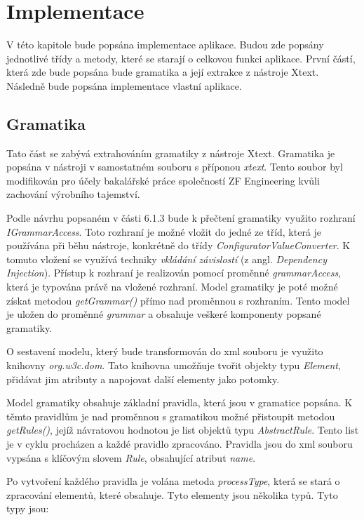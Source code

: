 \chapter{Implementace}

V této kapitole bude popsána implementace aplikace. Budou zde popsány jednotlivé třídy a metody, které se starají o celkovou funkci aplikace. První částí, která zde bude popsána bude gramatika a její extrakce z nástroje Xtext. Následně bude popsána implementace vlastní aplikace.

\section{Gramatika}

Tato část se zabývá extrahováním gramatiky z nástroje Xtext. Gramatika je popsána v nástroji v samostatném souboru s příponou \textit{xtext}. Tento soubor byl modifikován pro účely bakalářské práce společností ZF Engineering kvůli zachování výrobního tajemství.

Podle návrhu popsaném v části 6.1.3 bude k přečtení gramatiky využito rozhraní \textit{IGrammarAccess}. Toto rozhraní je možné vložit do jedné ze tříd, která je používána při běhu nástroje, konkrétně do třídy \textit{ConfiguratorValueConverter}. K tomuto vložení se využívá techniky \textit{vkládání závislostí} (z angl. \textit{Dependency Injection}). Přístup k rozhraní je realizován pomocí proměnné \textit{grammarAccess}, která je typována právě na vložené rozhraní. Model gramatiky je poté možné získat metodou \textit{getGrammar()} přímo nad proměnnou s rozhraním. Tento model je uložen do proměnné \textit{grammar} a obsahuje veškeré komponenty popsané gramatiky. 

O sestavení modelu, který bude transformován do xml souboru je využito knihovny \textit{org.w3c.dom}. Tato knihovna umožňuje tvořit objekty typu \textit{Element}, přidávat jim atributy a napojovat další elementy jako potomky. 

Model gramatiky obsahuje základní pravidla, která jsou v gramatice popsána. K těmto pravidlům je nad proměnnou s gramatikou možné přistoupit metodou \textit{getRules()}, jejíž návratovou hodnotou je list objektů typu \textit{AbstractRule}. Tento list je v cyklu procházen a každé pravidlo zpracováno. Pravidla jsou do xml souboru vypsána s klíčovým slovem \textit{Rule}, obsahující atribut \textit{name}.

Po vytvoření každého pravidla je volána metoda \textit{processType}, která se stará o zpracování elementů, které obsahuje. Tyto elementy jsou několika typů. Tyto typy jsou: 

